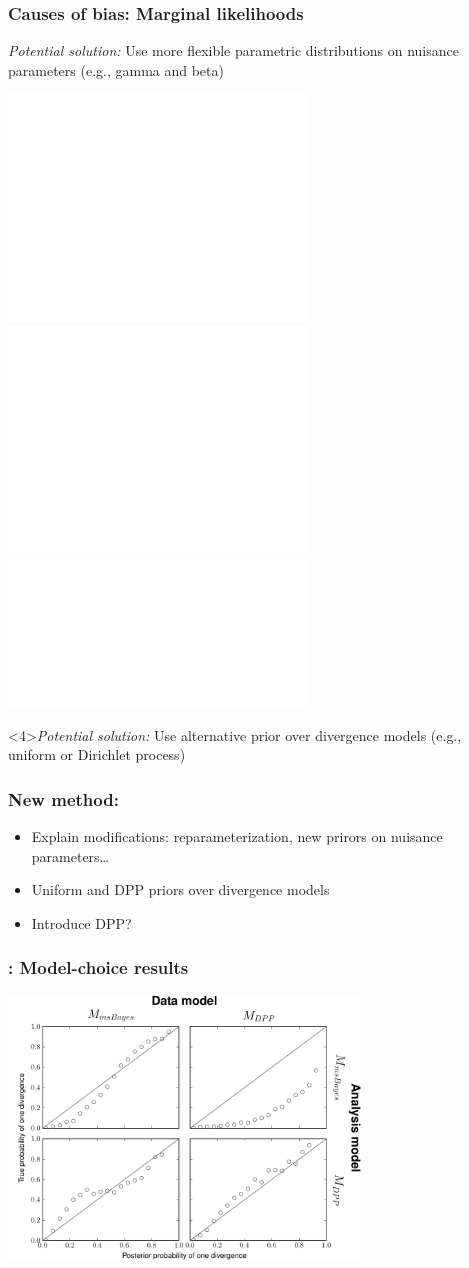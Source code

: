 \begin{frame}[t]
    \frametitle{Causes of bias: Marginal likelihoods}
    \begin{block}{\it Potential solution:}
        Use more flexible parametric distributions on nuisance parameters
        (e.g., gamma and beta)
    \end{block}
    \smallskip
    \centerline{
        \includegraphics<1>[height=6.0cm]{images/marginal-plot-2d-uniform-prior.pdf}
        \includegraphics<2>[height=6.0cm]{images/marginal-plot-2d.pdf}
        \includegraphics<3>[width=\textwidth]{images/partition_numbers.pdf}}
    \begin{block}<4>{\it Potential solution:}
        Use alternative prior over divergence models
        (e.g., uniform or Dirichlet process)
    \end{block}
\end{frame}


\begin{frame}
    \frametitle{New method: \dppmsbayes}
    \begin{itemize}
        \item Explain modifications: reparameterization, new prirors on nuisance parameters\ldots
        \item Uniform and DPP priors over divergence models
        \item Introduce DPP?
    \end{itemize}
\end{frame}

\begin{frame}
    \frametitle{\dppmsbayes: Model-choice results}
    \centerline{
        \includegraphics[height=7.0cm]{images/validation-model-choice-old-dpp.pdf}}
\end{frame}

